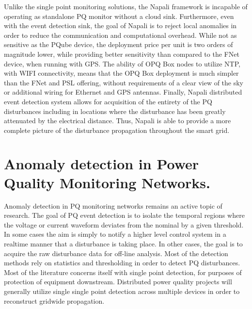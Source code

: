 Unlike the single point monitoring solutions, the Napali framework is incapable of operating as standalone PQ monitor without a cloud sink.
Furthermore, even with the event detection sink, the goal of Napali is to reject local anomalies in order to reduce the communication and computational overhead.
While not as sensitive as the PQube device, the deployment price per unit is two orders of magnitude lower, while providing better sensitivity than compared to the FNet device, when running with GPS.
The ability of OPQ Box nodes to utilize NTP, with WIFI connectivity, means that the OPQ Box deployment is much simpler than the FNet and PSL offering, without requirements of a clear view of the sky or additional wiring for Ethernet and GPS antennas.
Finally, Napali distributed event detection system allows for acquisition of the entirety of the PQ disturbances including in locations where the disturbance has been greatly attenuated by the electrical distance.
Thus, Napali is able to provide a more complete picture of the disturbance propagation throughout the smart grid.

\section{Anomaly detection in Power Quality Monitoring Networks.}\label{sec:anomaly-detection-in-power-quality-monitoring-networks.}

Anomaly detection in PQ monitoring networks remains an active topic of research.
The goal of PQ event detection is to isolate the temporal regions where the voltage or current waveform deviates from the nominal by a given threshold.
In some cases the aim is simply to notify a higher level control system in a realtime manner that a disturbance is taking place.
In other cases, the goal is to acquire the raw disturbance data for off-line analysis.
Most of the detection methods rely on statistics and thresholding in order to detect PQ disturbances.
Most of the literature concerns itself with single point detection, for purposes of protection of equipment downstream.\cite{gu2004statistical}\cite{karimi2000wavelet} \cite{shin2006power} Distributed power quality projects will generally utilize single single point detection across multiple devices in order to reconstruct gridwide propagation.\cite{von2014micro}

